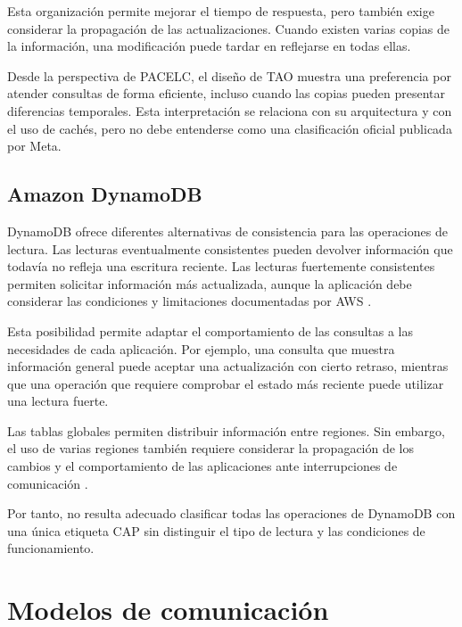 \documentclass[12pt,a4paper]{article}
\begin{document}
Esta organización permite mejorar el tiempo de respuesta, pero también exige considerar la propagación de las actualizaciones. Cuando existen varias copias de la información, una modificación puede tardar en reflejarse en todas ellas.

Desde la perspectiva de PACELC, el diseño de TAO muestra una preferencia por atender consultas de forma eficiente, incluso cuando las copias pueden presentar diferencias temporales. Esta interpretación se relaciona con su arquitectura y con el uso de cachés, pero no debe entenderse como una clasificación oficial publicada por Meta.

\subsection{Amazon DynamoDB}

DynamoDB ofrece diferentes alternativas de consistencia para las operaciones de lectura. Las lecturas eventualmente consistentes pueden devolver información que todavía no refleja una escritura reciente. Las lecturas fuertemente consistentes permiten solicitar información más actualizada, aunque la aplicación debe considerar las condiciones y limitaciones documentadas por AWS \cite{awsdynamodbconsistency}.

Esta posibilidad permite adaptar el comportamiento de las consultas a las necesidades de cada aplicación. Por ejemplo, una consulta que muestra información general puede aceptar una actualización con cierto retraso, mientras que una operación que requiere comprobar el estado más reciente puede utilizar una lectura fuerte.

Las tablas globales permiten distribuir información entre regiones. Sin embargo, el uso de varias regiones también requiere considerar la propagación de los cambios y el comportamiento de las aplicaciones ante interrupciones de comunicación \cite{awsdynamodbglobaltables}.

Por tanto, no resulta adecuado clasificar todas las operaciones de DynamoDB con una única etiqueta CAP sin distinguir el tipo de lectura y las condiciones de funcionamiento.

\section{Modelos de comunicación}
\end{document}
